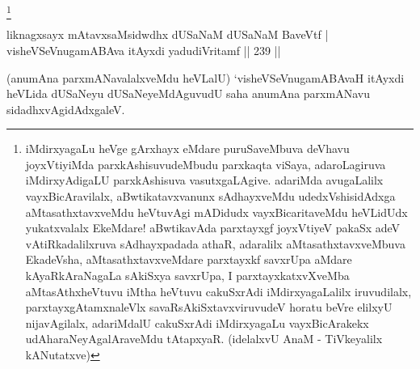 \begin{artha}
\footnote{iMdirxyagaLu heVge gArxhayx eMdare puruSaveMbuva deVhavu joyxVtiyiMda parxkAshisuvudeMbudu parxkaqta viSaya, adaroLagiruva iMdirxyAdigaLU parxkAshisuva vasutxgaLAgive. adariMda avugaLalilx vayxBicAravilalx, aBwtikatavxvanunx sAdhayxveMdu udedxVshisidAdxga aMtasathxtavxveMdu heVtuvAgi mADidudx vayxBicaritaveMdu heVLidUdx yukatxvalalx EkeMdare! aBwtikavAda parxtayxgf joyxVtiyeV pakaSx adeV vAtiRkadalilxruva sAdhayxpadada athaR, adaralilx aMtasathxtavxveMbuva EkadeVsha, aMtasathxtavxveMdare parxtayxkf savxrUpa aMdare kAyaRkAraNagaLa sAkiSxya savxrUpa, I parxtayxkatxvXveMba aMtasAthxheVtuvu iMtha heVtuvu cakuSxrAdi iMdirxyagaLalilx iruvudilalx, parxtayxgAtamxnaleVlx savaRsAkiSxtavxviruvudeV horatu beVre elilxyU nijavAgilalx, adariMdalU cakuSxrAdi iMdirxyagaLu vayxBicArakekx udAharaNeyAgalAraveMdu tAtapxyaR. (idelalxvU AnaM - TiVkeyalilx kANutatxve)}
\end{artha}


\begin{shl}
\footnotemark[1]{}liknagxsayx mAtavxsaMsidwdhx dUSaNaM dUSaNaM BaveVtf | \\
visheVSeV\s nugamABAva itAyxdi yadudiVritamf \hfill ||  239 ||  
\end{shl}

\begin{artha}
(anumAna parxmANavalalxveMdu heVLalU) `visheVSeV\s nugamABAvaH itAyxdi heVLida dUSaNeyu dUSaNeyeMdAguvudU saha anumAna parxmANavu sidadhxvAgidAdxgaleV.
\end{artha}

